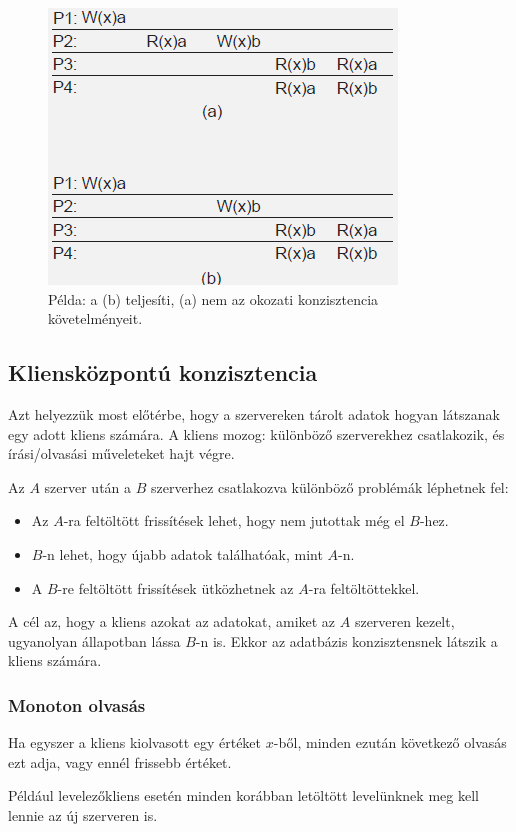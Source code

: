 \documentclass[margin=0px]{article}
\begin{document}
\begin{figure}[H]
    \centering
    \includegraphics[width=0.4\linewidth]{img/konz_okozati}
    \caption{Példa: a (b) teljesíti, (a) nem az okozati konzisztencia követelményeit.}
    \label{fig:konz_okozati}
\end{figure}

\subsection{Kliensközpontú konzisztencia}

Azt helyezzük most előtérbe, hogy a szervereken tárolt adatok hogyan látszanak egy adott kliens számára. A kliens
mozog: különböző szerverekhez csatlakozik, és írási/olvasási műveleteket hajt végre.

Az $A$ szerver után a $B$ szerverhez csatlakozva különböző problémák léphetnek fel:

\begin{itemize}
    \item	Az $A$-ra feltöltött frissítések lehet, hogy nem jutottak még el $B$-hez.
    \item	$B$-n lehet, hogy újabb adatok találhatóak, mint $A$-n.
    \item	A $B$-re feltöltött frissítések ütközhetnek az $A$-ra feltöltöttekkel.
\end{itemize}

A cél az, hogy a kliens azokat az adatokat, amiket az $A$ szerveren kezelt, ugyanolyan állapotban
lássa $B$-n is. Ekkor az adatbázis konzisztensnek látszik a kliens számára.\\

\subsubsection{Monoton olvasás}
Ha egyszer a kliens kiolvasott egy értéket $x$-ből, minden ezután következő
olvasás ezt adja, vagy ennél frissebb értéket.

Például levelezőkliens esetén minden korábban letöltött levelünknek meg kell lennie az új szerveren is.
\end{document}
